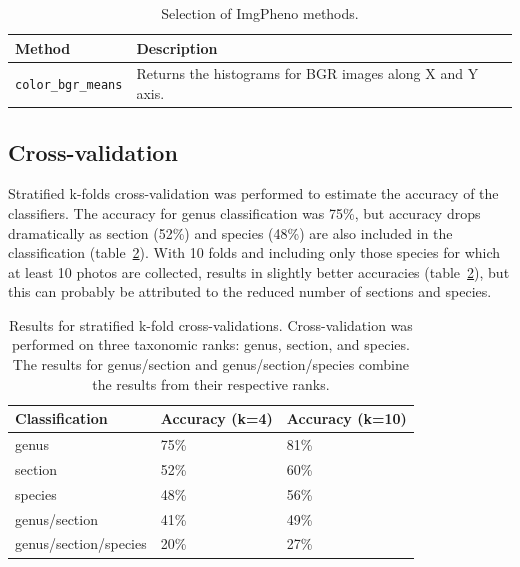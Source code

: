 \documentclass[3p,twocolumn,10pt]{elsarticle}
\begin{document}
\begin{table}[h]\footnotesize
    \caption{Selection of ImgPheno methods.}
    \begin{center}
    \begin{tabular}{lp{4cm}}
    \toprule
    \textbf{Method} & \textbf{Description} \\
    \midrule
    \verb/color_bgr_means/ & Returns the histograms for BGR images along X and Y axis. \\
    \bottomrule
    \end{tabular}
    \end{center}
    \label{tbl:imgpheno-methods}
\end{table}

\subsection{Cross-validation}

Stratified k-folds cross-validation was performed to estimate the accuracy of the classifiers. The accuracy for genus classification was 75\%, but accuracy drops dramatically as section (52\%) and species (48\%) are also included in the classification (table~\ref{tbl:x-validation-results}). With 10 folds and including only those species for which at least 10 photos are collected, results in slightly better accuracies (table~\ref{tbl:x-validation-results}), but this can probably be attributed to the reduced number of sections and species.

\begin{table}[h]\footnotesize
    \caption{Results for stratified k-fold cross-validations. Cross-validation was performed on three taxonomic ranks: genus, section, and species. The results for genus/section and genus/section/species combine the results from their respective ranks.}
    \begin{center}
    \begin{tabular}{lp{1.5cm}p{1.5cm}}
    \toprule
    \textbf{Classification} & \textbf{Accuracy (k=4)} & \textbf{Accuracy (k=10)} \\
    \midrule
    genus                   & 75\%    & 81\% \\
    section                 & 52\%    & 60\% \\
    species                 & 48\%    & 56\% \\
    genus/section           & 41\%    & 49\% \\
    genus/section/species   & 20\%    & 27\% \\
    \bottomrule
    \end{tabular}
    \end{center}
    \label{tbl:x-validation-results}
\end{table}
\end{document}
